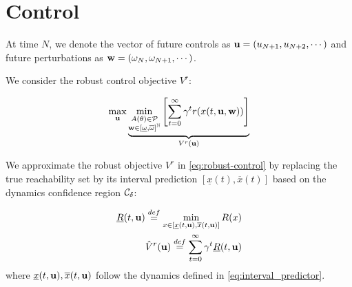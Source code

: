 \documentclass{article}
\begin{document}


\section{Control}

\label{sec:control}

At time $N$, we denote the vector of future controls as $\mathbf{u} = (u_{N+1},u_{N+2},\cdots)$ and future perturbations as $\mathbf{w} = (\omega_N, \omega_{N+1},\cdots)$.

We consider the robust control objective $V^r$:

\begin{equation}
\label{eq:robust-control}
\max_{\mathbf{u}} \underbrace{\min_{\substack{A(\theta) \in \mathcal{P} \\ \mathbf{w}\in[\underline{\omega},\overline{\omega}]^{\mathbb{N}}}} \left[\sum_{t=0}^\infty \gamma^t r(x(t,\mathbf{u},\mathbf{w}))\right]}_{V^r(\mathbf{u})}
\end{equation}


\begin{definition}
We approximate the robust objective $V^r$ in \eqref{eq:robust-control} by replacing the true reachability set by its interval prediction $[\underline{x}(t), \overline{x}(t)]$ based on the dynamics confidence region $\mathcal{C}_\delta$:

\begin{align}
\underline{R}(t,\mathbf{u}) \stackrel{def}{=} \min_{x\in[\underline{x}(t, \mathbf{u}), \overline{x}(t, \mathbf{u})]}  R(x) \\
\hat{V}^r(\mathbf{u}) \stackrel{def}{=} \sum_{t=0}^\infty \gamma^t \underline{R}(t,\mathbf{u}) \label{eq:surrogate_objective}
\end{align}
where $\underline{x}(t, \mathbf{u}), \overline{x}(t, \mathbf{u})$ follow the dynamics defined in \eqref{eq:interval_predictor}.
\end{definition}
\end{document}
